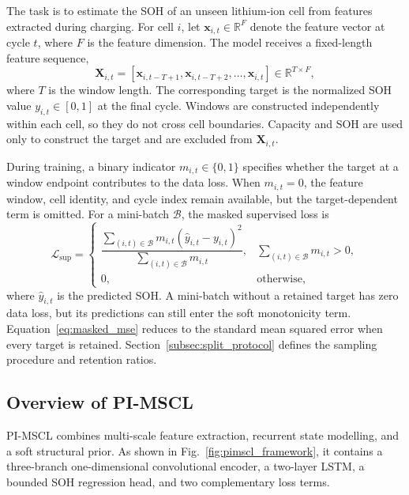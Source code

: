 \documentclass[pdflatex,sn-mathphys-num]{sn-jnl}
\begin{document}
The task is to estimate the SOH of an unseen lithium-ion cell from features extracted during charging. For cell $i$, let $\mathbf{x}_{i,t}\in\mathbb{R}^{F}$ denote the feature vector at cycle $t$, where $F$ is the feature dimension. The model receives a fixed-length feature sequence,
\begin{equation}
\mathbf{X}_{i,t}=\left[\mathbf{x}_{i,t-T+1},\mathbf{x}_{i,t-T+2},\ldots,\mathbf{x}_{i,t}\right]\in\mathbb{R}^{T\times F},
\label{eq:input_sequence}
\end{equation}
where $T$ is the window length. The corresponding target is the normalized SOH value $y_{i,t}\in[0,1]$ at the final cycle. Windows are constructed independently within each cell, so they do not cross cell boundaries. Capacity and SOH are used only to construct the target and are excluded from $\mathbf{X}_{i,t}$.

During training, a binary indicator $m_{i,t}\in\{0,1\}$ specifies whether the target at a window endpoint contributes to the data loss. When $m_{i,t}=0$, the feature window, cell identity, and cycle index remain available, but the target-dependent term is omitted. For a mini-batch $\mathcal{B}$, the masked supervised loss is
\begin{equation}
\mathcal{L}_{\mathrm{sup}}=
\begin{cases}
\dfrac{\sum_{(i,t)\in\mathcal{B}} m_{i,t}\left(\hat{y}_{i,t}-y_{i,t}\right)^2}
{\sum_{(i,t)\in\mathcal{B}} m_{i,t}}, & \sum_{(i,t)\in\mathcal{B}}m_{i,t}>0,\\[6pt]
0, & \text{otherwise},
\end{cases}
\label{eq:masked_mse}
\end{equation}
where $\hat{y}_{i,t}$ is the predicted SOH. A mini-batch without a retained target has zero data loss, but its predictions can still enter the soft monotonicity term. Equation~\eqref{eq:masked_mse} reduces to the standard mean squared error when every target is retained. Section~\ref{subsec:split_protocol} defines the sampling procedure and retention ratios.

\subsection{Overview of PI-MSCL}
\label{subsec:overview}

PI-MSCL combines multi-scale feature extraction, recurrent state modelling, and a soft structural prior. As shown in Fig.~\ref{fig:pimscl_framework}, it contains a three-branch one-dimensional convolutional encoder, a two-layer LSTM, a bounded SOH regression head, and two complementary loss terms.
\end{document}
